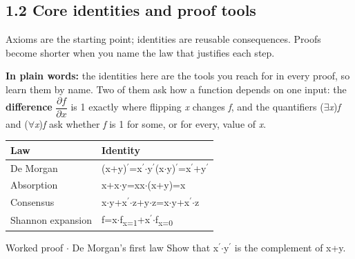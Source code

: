 \documentclass[11pt]{article}
\begin{document}
\begin{keepsection}
\section{1.2 Core identities and proof tools}

Axioms are the starting point; identities are reusable consequences. Proofs become shorter when you name the law that justifies each step.

\begin{plainbox}\textbf{In plain words:} the identities here are the tools you reach for in every proof, so learn them by name. Two of them ask how a function depends on one input: the \textbf{difference} {\small\ensuremath{\dfrac{∂{f}}{∂{x}}}} is 1 exactly where flipping \textit{x} changes \textit{f}, and the quantifiers (\ensuremath{\exists}\textit{x})\textit{f} and (\ensuremath{\forall}\textit{x})\textit{f} ask whether \textit{f} is 1 for some, or for every, value of \textit{x}.\end{plainbox}

\begin{center}\small\begin{tabularx}{\linewidth}{>{\raggedright\arraybackslash}X>{\raggedright\arraybackslash}X}\toprule
\textbf{Law} & \textbf{Identity} \\ \midrule
De Morgan & (x+y)\ensuremath{{}^{\prime}}=x\ensuremath{{}^{\prime}}\ensuremath{\cdot}y\ensuremath{{}^{\prime}}(x\ensuremath{\cdot}y)\ensuremath{{}^{\prime}}=x\ensuremath{{}^{\prime}}+y\ensuremath{{}^{\prime}} \\
Absorption & x+x\ensuremath{\cdot}y=xx\ensuremath{\cdot}(x+y)=x \\
Consensus & x\ensuremath{\cdot}y+x\ensuremath{{}^{\prime}}\ensuremath{\cdot}z+y\ensuremath{\cdot}z=x\ensuremath{\cdot}y+x\ensuremath{{}^{\prime}}\ensuremath{\cdot}z \\
Shannon expansion & f=x\ensuremath{\cdot}f\textsubscript{x=1}+x\ensuremath{{}^{\prime}}\ensuremath{\cdot}f\textsubscript{x=0} \\
\bottomrule\end{tabularx}\end{center}

\begin{workedbox}{Worked proof \ensuremath{\cdot} De Morgan’s first law}
Show that x\ensuremath{{}^{\prime}}\ensuremath{\cdot}y\ensuremath{{}^{\prime}} is the complement of x+y.


\end{workedbox}
\end{keepsection}
\end{document}
